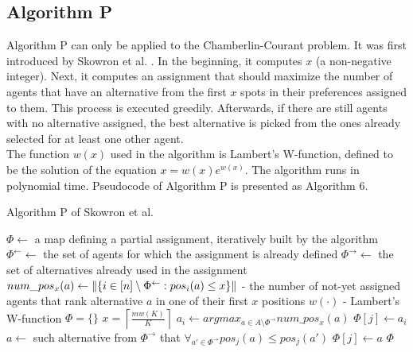 \subsection{Algorithm P}

Algorithm P can only be applied to the Chamberlin-Courant problem. It was first introduced by Skowron et al. \cite{1}. In the beginning, it computes $x$ (a non-negative integer). Next, it computes an assignment that should maximize the number of agents that have an alternative from the first $x$ spots in their preferences assigned to them. This process is executed greedily. Afterwards, if there are still agents with no alternative assigned, the best alternative is picked from the ones already selected for at least one other agent.
\\

The function $w(x)$ used in the algorithm is Lambert's W-function, defined to be the solution of the equation $x = w(x)e^{w(x)}$. The algorithm runs in polynomial time. Pseudocode of Algorithm P is presented as Algorithm 6.

\begin{algorithm}
\caption{Algorithm P of Skowron et al. \cite{1}}\label{euclid}
\begin{algorithmic}[1]
		\State $\Phi \gets$ a map defining a partial assignment, iteratively built by the algorithm
		\State $\Phi^{\leftarrow} \gets$ the set of agents for which the assignment is already defined
		\State $\Phi^{\rightarrow} \gets$ the set of alternatives already used in the assignment
		\State $num\_pos_{x}(a) \gets \lVert\left\{ i \in [n] \setminus \Phi^{\leftarrow} : pos_{i}(a) \leq x \right\}\rVert$ - the number of not-yet assigned agents that rank alternative $a$ in one of their first $x$ positions
		\State $w(\cdot)$ - Lambert's W-function
		\State $\Phi = \{\}$
		\State $x = \left\lceil \frac{mw(K)}{K} \right\rceil$
			\State $a_{i} \gets argmax_{a \in A \setminus \Phi^{\rightarrow}} num\_pos_{x}(a)$
					\State $\Phi[j] \gets a_{i}$
				\EndIf
			\EndFor
		\EndFor
			\State $a \gets$ such alternative from $\Phi^{\rightarrow}$ that $\forall_{a' \in \Phi^{\rightarrow}} pos_{j}(a) \leq pos_{j}(a')$
			\State $\Phi[j] \gets a$
		\EndFor
		\State \Return $\Phi$
	\EndProcedure
\end{algorithmic}
\end{algorithm}

